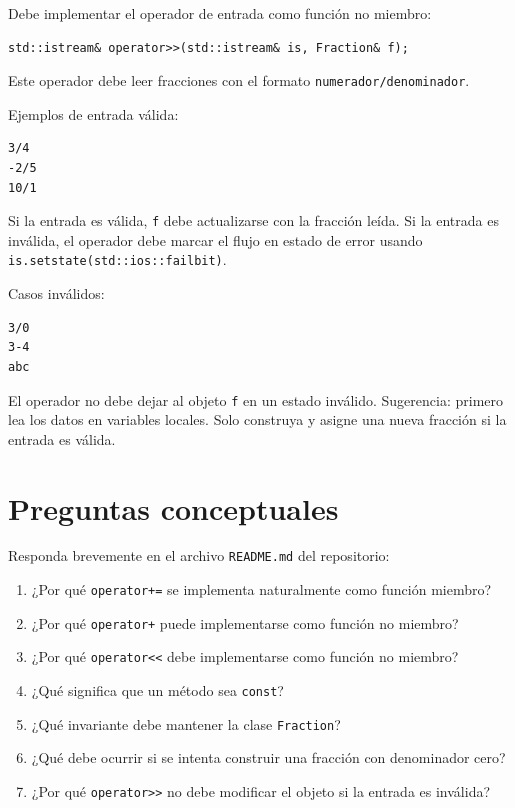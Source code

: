 \documentclass[11pt,a4paper]{article}
\begin{document}
Debe implementar el operador de entrada como función no miembro:

\begin{lstlisting}
std::istream& operator>>(std::istream& is, Fraction& f);
\end{lstlisting}

Este operador debe leer fracciones con el formato \lstinline|numerador/denominador|.

Ejemplos de entrada válida:

\begin{lstlisting}[language={}]
3/4
-2/5
10/1
\end{lstlisting}

Si la entrada es válida, \lstinline|f| debe actualizarse con la fracción leída. Si la entrada es inválida, el operador debe marcar el flujo en estado de error usando \lstinline|is.setstate(std::ios::failbit)|.

Casos inválidos:

\begin{lstlisting}[language={}]
3/0
3-4
abc
\end{lstlisting}

El operador no debe dejar al objeto \lstinline|f| en un estado inválido. Sugerencia: primero lea los datos en variables locales. Solo construya y asigne una nueva fracción si la entrada es válida.

\section{Preguntas conceptuales}

Responda brevemente en el archivo \lstinline|README.md| del repositorio:

\begin{enumerate}
  \item ¿Por qué \lstinline|operator+=| se implementa naturalmente como función miembro?
  \item ¿Por qué \lstinline|operator+| puede implementarse como función no miembro?
  \item ¿Por qué \lstinline|operator<<| debe implementarse como función no miembro?
  \item ¿Qué significa que un método sea \lstinline|const|?
  \item ¿Qué invariante debe mantener la clase \lstinline|Fraction|?
  \item ¿Qué debe ocurrir si se intenta construir una fracción con denominador cero?
  \item ¿Por qué \lstinline|operator>>| no debe modificar el objeto si la entrada es inválida?
\end{enumerate}
\end{document}
